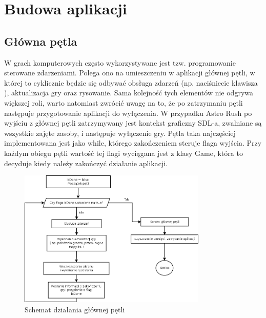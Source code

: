 \chapter{Budowa aplikacji} 

\section{Główna pętla}

W grach komputerowych często wykorzystywane jest tzw. programowanie sterowane zdarzeniami. Polega ono na umieszczeniu w aplikacji głównej pętli, w której to cyklicznie będzie się odbywać obsługa zdarzeń (np. naciśniecie klawisza ), aktualizacja gry oraz rysowanie. Sama kolejność tych elementów nie odgrywa większej roli, warto natomiast zwrócić uwagę na to, że po zatrzymaniu pętli następuje przygotowanie aplikacji do wyłączenia. W przypadku Astro Rush po wyjściu z głównej pętli zatrzymywany jest kontekst graficzny SDL-a, zwalniane są wszystkie zajęte zasoby, i następuje wyłączenie gry. Pętla taka najczęściej implementowana jest jako while, którego zakończeniem steruje flaga wyjścia. Przy każdym obiegu pętli wartość tej flagi wyciągana jest z klasy Game, która to decyduje kiedy należy zakończyć działanie aplikacji. 

\begin{figure}[h]
    \centering
    \includegraphics[width=0.8\textwidth,natwidth=410,natheight=142]{./Pictures/main_loop.png}
    \caption{Schemat działania głównej pętli}
\end{figure}

